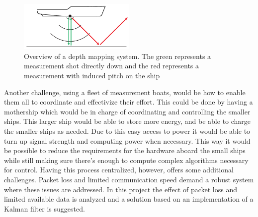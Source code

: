 \begin{figure}[h]
\centering
\includegraphics[width=0.5\textwidth]{img/beamer}
\caption{Overview of a depth mapping system. The green represents a measurement shot directly down and the red represents a measurement with induced pitch on the ship}
\label{fig:beamer}
\end{figure}

Another challenge, using a fleet of measurement boats, would be how to enable them all to coordinate and effectivize their effort. This could be done by having a mothership which would be in charge of coordinating and controlling the smaller ships. This larger ship would be able to store more energy, and be able to charge the smaller ships as needed. Due to this easy access to power it would be able to turn up signal strength and computing power when necessary. This way it would be possible to reduce the requirements for the hardware aboard the small ships while still making sure there's enough to compute complex algorithms necessary for control. Having this process centralized, however, offers some additional challenges. Packet loss and limited communication speed demand a robust system where these issues are addressed. In this project the effect of packet loss and limited available data is analyzed and a solution based on an implementation of a Kalman filter is suggested.
